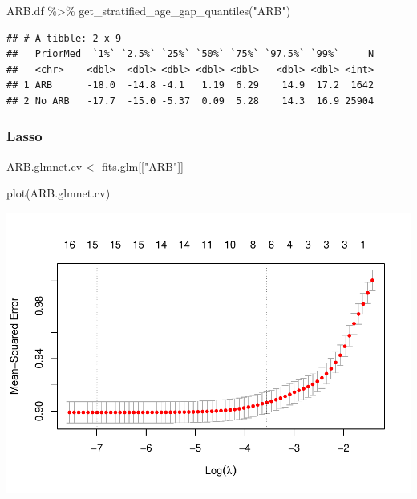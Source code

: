 \documentclass[
]{article}
\newenvironment{Shaded}{\begin{snugshade}}{\end{snugshade}}
\newcommand{\FunctionTok}[1]{\textcolor[rgb]{0.00,0.00,0.00}{#1}}
\newcommand{\NormalTok}[1]{#1}
\newcommand{\OtherTok}[1]{\textcolor[rgb]{0.56,0.35,0.01}{#1}}
\newcommand{\SpecialCharTok}[1]{\textcolor[rgb]{0.00,0.00,0.00}{#1}}
\newcommand{\StringTok}[1]{\textcolor[rgb]{0.31,0.60,0.02}{#1}}
\begin{document}
\begin{Shaded}
\begin{Highlighting}[]
\NormalTok{ARB.df }\SpecialCharTok{\%\textgreater{}\%} 
    \FunctionTok{get\_stratified\_age\_gap\_quantiles}\NormalTok{(}\StringTok{"ARB"}\NormalTok{)}
\end{Highlighting}
\end{Shaded}

\begin{verbatim}
## # A tibble: 2 x 9
##   PriorMed  `1%` `2.5%` `25%` `50%` `75%` `97.5%` `99%`     N
##   <chr>    <dbl>  <dbl> <dbl> <dbl> <dbl>   <dbl> <dbl> <int>
## 1 ARB      -18.0  -14.8 -4.1   1.19  6.29    14.9  17.2  1642
## 2 No ARB   -17.7  -15.0 -5.37  0.09  5.28    14.3  16.9 25904
\end{verbatim}

\hypertarget{lasso-5}{%
\subsubsection{Lasso}\label{lasso-5}}

\begin{Shaded}
\begin{Highlighting}[]
\NormalTok{ARB.glmnet.cv }\OtherTok{\textless{}{-}}\NormalTok{ fits.glm[[}\StringTok{"ARB"}\NormalTok{]]}
\end{Highlighting}
\end{Shaded}

\begin{Shaded}
\begin{Highlighting}[]
\FunctionTok{plot}\NormalTok{(ARB.glmnet.cv) }
\end{Highlighting}
\end{Shaded}

\includegraphics{../results/report_files/figure-latex/ARB-lasso-plot-1.pdf}
\end{document}
